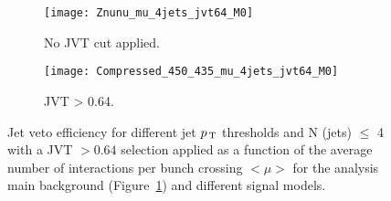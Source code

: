 \begin{figure}[!h]
  \centering
  \begin{subfigure}[t]{.48\linewidth}
    \texttt{[image: Znunu\_mu\_4jets\_jvt64\_M0]}
    \caption{No JVT cut applied.}
    \label{fig:znunu_4jets_jvt64}
  \end{subfigure}
  \begin{subfigure}[t]{.48\linewidth}
    \texttt{[image: Compressed\_450\_435\_mu\_4jets\_jvt64\_M0]}
    \caption{JVT > 0.64.}
    \label{fig:comp_4jets_jvt64_1}
  \end{subfigure}
  \caption{Jet veto efficiency for different jet $p_\mathrm{\, T}$ thresholds and N (jets)
    $\leq$ 4 with a JVT $> 0.64$ selection applied as a function of the average
    number of interactions per bunch crossing $<\mu>$ for the analysis main
    background (Figure~\ref{fig:znunu_4jets_jvt64}) and different signal models.}
  \label{fig:jet_veto_comparison}
\end{figure}
